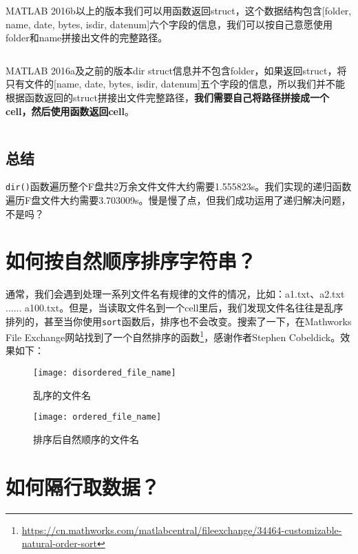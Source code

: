 MATLAB 2016b以上的版本我们可以用函数返回struct，这个数据结构包含[folder, name, date, bytes, isdir, datenum]六个字段的信息，我们可以按自己意愿使用folder和name拼接出文件的完整路径。

\inputminted[firstline=1]{Matlab}{code/matlab/get_all_file_name_R2016b_newer.m}

MATLAB 2016a及之前的版本dir struct信息并不包含folder，如果返回struct，将只有文件的[name, date, bytes, isdir, datenum]五个字段的信息，所以我们并不能根据函数返回的struct拼接出文件完整路径，\textbf{我们需要自己将路径拼接成一个cell，然后使用函数返回cell}。

\inputminted{Matlab}{code/matlab/get_all_file_name_R2016a_older.m}

\subsection*{总结}
\texttt{dir()}函数遍历整个F盘共2万余文件文件大约需要1.555823s。我们实现的递归函数遍历F盘文件大约需要3.703009s。慢是慢了点，但我们成功运用了递归解决问题，不是吗？

\section{如何按自然顺序排序字符串？}

通常，我们会遇到处理一系列文件名有规律的文件的情况，比如：a1.txt、a2.txt ...... a100.txt。但是，当读取文件名到一个cell里后，我们发现文件名往往是乱序排列的，甚至当你使用\texttt{sort}函数后，排序也不会改变。搜索了一下，在Mathworks File Exchange网站找到了一个自然排序的函数\footnote{\url{https://cn.mathworks.com/matlabcentral/fileexchange/34464-customizable-natural-order-sort}}，感谢作者Stephen Cobeldick。效果如下：

\begin{figure}[h]
    \centering
    \begin{minipage}{0.45\textwidth}
        \centering
        \texttt{[image: disordered\_file\_name]}
        \caption{乱序的文件名}
    \end{minipage}
    \begin{minipage}{0.45\textwidth}
        \centering
        \texttt{[image: ordered\_file\_name]}
        \caption{排序后自然顺序的文件名}
    \end{minipage}
\end{figure}

\section{如何隔行取数据？}

